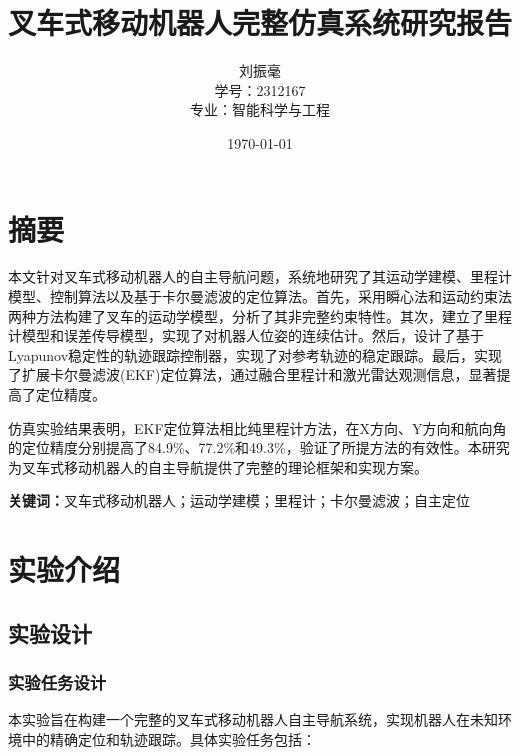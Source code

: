 \documentclass[12pt,a4paper]{report}
\title{\heiti\erhao 叉车式移动机器人完整仿真系统研究报告}
\author{\xiaosihao 刘振毫\\学号：2312167\\专业：智能科学与工程}
\date{\xiaosihao \today}
\begin{document}
\maketitle

\chapter*{摘要}

本文针对叉车式移动机器人的自主导航问题，系统地研究了其运动学建模、里程计模型、控制算法以及基于卡尔曼滤波的定位算法。首先，采用瞬心法和运动约束法两种方法构建了叉车的运动学模型，分析了其非完整约束特性。其次，建立了里程计模型和误差传导模型，实现了对机器人位姿的连续估计。然后，设计了基于Lyapunov稳定性的轨迹跟踪控制器，实现了对参考轨迹的稳定跟踪。最后，实现了扩展卡尔曼滤波(EKF)定位算法，通过融合里程计和激光雷达观测信息，显著提高了定位精度。

仿真实验结果表明，EKF定位算法相比纯里程计方法，在X方向、Y方向和航向角的定位精度分别提高了84.9\%、77.2\%和49.3\%，验证了所提方法的有效性。本研究为叉车式移动机器人的自主导航提供了完整的理论框架和实现方案。

\vspace{12pt}
\noindent\textbf{关键词：}叉车式移动机器人；运动学建模；里程计；卡尔曼滤波；自主定位

\tableofcontents
\listoffigures
\listoftables


\chapter{实验介绍}

\section{实验设计}

\subsection{实验任务设计}

本实验旨在构建一个完整的叉车式移动机器人自主导航系统，实现机器人在未知环境中的精确定位和轨迹跟踪。具体实验任务包括：
\end{document}
